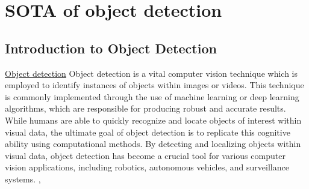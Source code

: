 \section{SOTA of object detection}
\subsection{Introduction to Object Detection}
\href{https://www.mathworks.com/discovery/object-detection.html#:~:text=Object%20detection%20is%20a%20computer,learning%20to%20produce%20meaningful%20results.}{Object detection} Object detection is a vital computer vision technique which is employed to identify instances of objects within images or videos. This technique is commonly implemented through the use of machine learning or deep learning algorithms, which are responsible for producing robust and accurate results. While humans are able to quickly recognize and locate objects of interest within visual data, the ultimate goal of object detection is to replicate this cognitive ability using computational methods. By detecting and localizing objects within visual data, object detection has become a crucial tool for various computer vision applications, including robotics, autonomous vehicles, and surveillance systems. \cite{zhao2019object}, \cite{ansari2020building}

